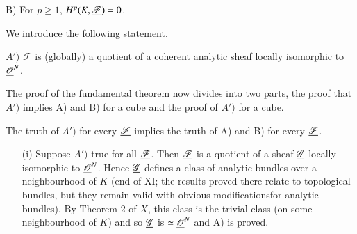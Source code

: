 B) For $p \geq 1$, $H^p (K, \underline{\mathscr{F}}) = 0$. 

We introduce the following statement.

$A')$ $\mathscr{F}$ is (globally) a quotient of a coherent analytic
sheaf locally isomorphic to $\underline{\mathscr{O}}^N$. 

The proof of the fundamental theorem now divides into two parts, the
proof that $A')$ implies A) and B) for a cube and the proof of $A')$
for a cube.

\begin{step}%
The truth of $A')$ for every $\underline{\mathscr{F}}$ implies the truth of A)
and B) for every $\underline{\mathscr{F}}$.
\begin{itemize}
\item[(i)] Suppose $A')$ true for all $\underline{\mathscr{F}}$. Then
  $\underline{\mathscr{F}}$ is a quotient of a sheaf $\underline{\mathscr{G}}$ locally
  isomorphic to $\underline{\mathscr{O}}^N$. Hence $\underline{\mathscr{G}}$ defines a
  class of analytic bundles over a neighbourhood of $K$ (end of XI;
  the results proved there relate to topological bundles, but they
  remain valid with obvious modifications\pageoriginale for analytic
  bundles). By Theorem 2 of $X$, this class is the trivial class (on
  some neighbourhood of $K$) and so $\underline{\mathscr{G}}$ is $\simeq
  \underline{\mathscr{O}}^N$ and A) is proved. 


\end{itemize}
\end{step}
